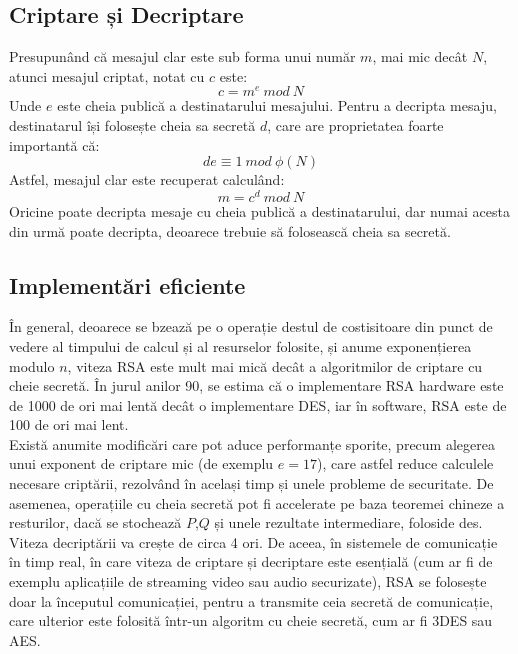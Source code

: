 \documentclass[12]{report}
\begin{document}
\subsection{Criptare și Decriptare}
Presupunând că mesajul clar este sub forma unui număr $m$, mai mic decât $N$, atunci mesajul criptat, notat cu $c$ este:
$$c = m^e \ mod \ N$$
Unde $e$ este cheia publică a destinatarului mesajului. Pentru a decripta mesaju, destinatarul își folosește cheia sa secretă $d$, care are proprietatea foarte importantă că:
$$de \equiv 1 \ mod \ \phi(N)$$
Astfel, mesajul clar este recuperat calculând:
$$m = c^d \ mod \ N$$
Oricine poate decripta mesaje cu cheia publică a destinatarului, dar numai acesta din urmă poate decripta, deoarece trebuie să folosească cheia sa secretă.
\subsection{Implementări eficiente}
În general, deoarece se bzează pe o operație destul de costisitoare din punct de vedere al timpului de calcul și al resurselor folosite, și anume exponențierea modulo $n$, viteza RSA este mult mai mică decât a algoritmilor de criptare cu cheie secretă. În jurul anilor 90, se estima că o implementare RSA hardware este de 1000 de ori mai lentă decât o implementare DES, iar în software, RSA este de 100 de ori mai lent. \\
Există anumite modificări care pot aduce performanțe sporite, precum alegerea unui exponent de criptare mic (de exemplu $e=17$), care astfel reduce calculele necesare criptării, rezolvând în același timp și unele probleme de securitate. De asemenea, operațiile cu cheia secretă pot fi accelerate pe baza teoremei chineze a resturilor, dacă se stochează $P$,$Q$ și unele rezultate intermediare, foloside des.  Viteza decriptării va crește de circa 4 ori. De aceea, în sistemele de comunicație în timp real, în care viteza de criptare și decriptare este esențială (cum ar fi de exemplu aplicațiile de streaming video sau audio securizate), RSA se folosește doar la începutul comunicației, pentru a transmite ceia secretă de comunicație, care ulterior este folosită într-un algoritm cu cheie secretă, cum ar fi 3DES sau AES.
\end{document}
